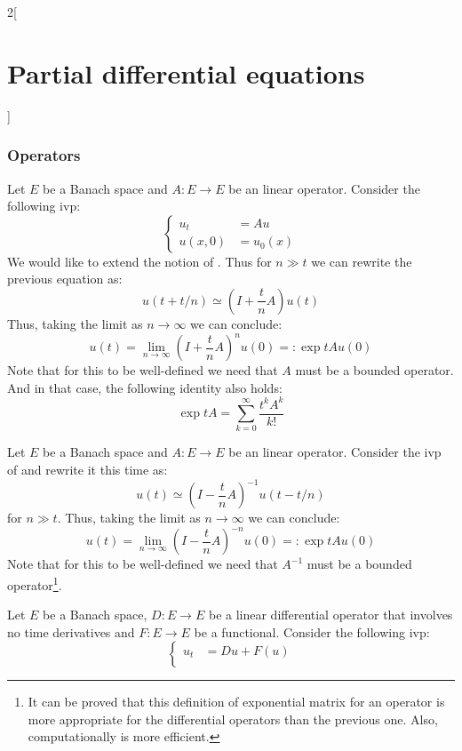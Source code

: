 \documentclass[../../../main_math.tex]{subfiles}
\begin{document}
\begin{multicols}{2}[\section{Partial differential equations}]
  \subsubsection{Operators}
  \begin{definition}
    Let $E$ be a Banach space and $A:E\rightarrow E$ be an linear operator. Consider the following ivp:
    \begin{equation}\label{PDE:operatorpde}
      \left\{
      \begin{aligned}
        u_{t}  & =A u    \\
        u(x,0) & =u_0(x)
      \end{aligned}
      \right.
    \end{equation}
    We would like to extend the notion of . Thus for $n\gg t$ we can rewrite the previous equation as:
    $$u(t +t/n)\simeq \left(I+\frac{t}{n}A\right)u(t)$$
    Thus, taking the limit as $n\to \infty$ we can conclude: $$u(t)=\lim_{n\to\infty}{\left(I+\frac{t}{n}A\right)}^nu(0)=:\exp{tA}u(0)$$
    Note that for this to be well-defined we need that $A$ must be a bounded operator. And in that case, the following identity also holds: $$\exp{tA}=\sum_{k=0}^\infty\frac{t^kA^k}{k!}$$
  \end{definition}
  \begin{definition}
    Let $E$ be a Banach space and $A:E\rightarrow E$ be an linear operator. Consider the ivp of  and rewrite it this time as:
    $$ u(t)\simeq{\left(I-\frac{t}{n}A\right)}^{-1}u(t-t/n)$$
    for $n\gg t$.
    Thus, taking the limit as $n\to \infty$ we can conclude: $$u(t)=\lim_{n\to\infty}{\left(I-\frac{t}{n}A\right)}^{-n}u(0)=:\exp{tA}u(0)$$
    Note that for this to be well-defined we need that $A^{-1}$ must be a bounded operator\footnote{It can be proved that this definition of exponential matrix for an operator is more appropriate for the differential operators than the previous one. Also, computationally is more efficient.}.
  \end{definition}
  \begin{proposition}
    Let $E$ be a Banach space, $D:E\rightarrow E$ be a linear differential operator that involves no time derivatives and $F:E\rightarrow E$ be a functional. Consider the following ivp:
    \begin{equation}
      \left\{
      \begin{aligned}
        u_{t}  & =D u +F(u) \\

\end{aligned}
\end{equation}
\end{proposition}
\end{multicols}
\end{document}
